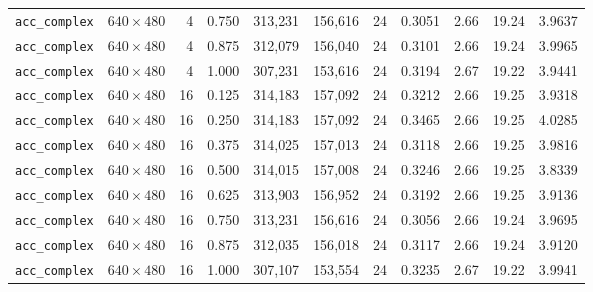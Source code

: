 \documentclass{article}
\begin{document}
{\begin{longtable}{@{}llrrrrrrrrr@{}}
\texttt{acc\_complex} & $640\times 480$  & 4  & 0.750 & 313{,}231 & 156{,}616 & 24 & 0.3051 & 2.66    & 19.24   & 3.9637  \\
\texttt{acc\_complex} & $640\times 480$  & 4  & 0.875 & 312{,}079 & 156{,}040 & 24 & 0.3101 & 2.66    & 19.24   & 3.9965  \\
\texttt{acc\_complex} & $640\times 480$  & 4  & 1.000 & 307{,}231 & 153{,}616 & 24 & 0.3194 & 2.67    & 19.22   & 3.9441  \\
\texttt{acc\_complex} & $640\times 480$  & 16 & 0.125 & 314{,}183 & 157{,}092 & 24 & 0.3212 & 2.66    & 19.25   & 3.9318  \\
\texttt{acc\_complex} & $640\times 480$  & 16 & 0.250 & 314{,}183 & 157{,}092 & 24 & 0.3465 & 2.66    & 19.25   & 4.0285  \\
\texttt{acc\_complex} & $640\times 480$  & 16 & 0.375 & 314{,}025 & 157{,}013 & 24 & 0.3118 & 2.66    & 19.25   & 3.9816  \\
\texttt{acc\_complex} & $640\times 480$  & 16 & 0.500 & 314{,}015 & 157{,}008 & 24 & 0.3246 & 2.66    & 19.25   & 3.8339  \\
\texttt{acc\_complex} & $640\times 480$  & 16 & 0.625 & 313{,}903 & 156{,}952 & 24 & 0.3192 & 2.66    & 19.25   & 3.9136  \\
\texttt{acc\_complex} & $640\times 480$  & 16 & 0.750 & 313{,}231 & 156{,}616 & 24 & 0.3056 & 2.66    & 19.24   & 3.9695  \\
\texttt{acc\_complex} & $640\times 480$  & 16 & 0.875 & 312{,}035 & 156{,}018 & 24 & 0.3117 & 2.66    & 19.24   & 3.9120  \\
\texttt{acc\_complex} & $640\times 480$  & 16 & 1.000 & 307{,}107 & 153{,}554 & 24 & 0.3235 & 2.67    & 19.22   & 3.9941  \\
\end{longtable}
}
\end{document}
